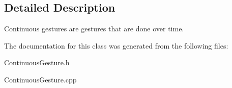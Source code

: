 \subsection{Detailed Description}
Continuous gestures are gestures that are done over time. 

The documentation for this class was generated from the following files\+:\begin{DoxyCompactItemize}
\item 
Continuous\+Gesture.\+h\item 
Continuous\+Gesture.\+cpp\end{DoxyCompactItemize}
